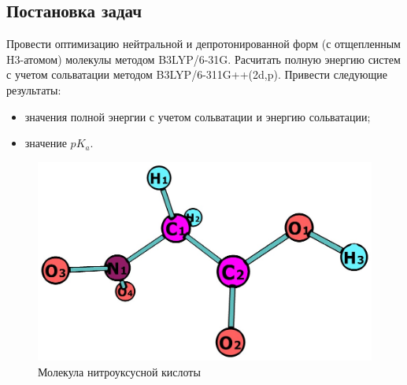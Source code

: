 \subsection{Постановка задач}
Провести оптимизацию нейтральной и депротонированной форм (с отщепленным H3-атомом) молекулы методом B3LYP/6-31G. Расчитать полную энергию систем с учетом сольватации методом B3LYP/6-311G++(2d,p). Привести следующие результаты: 
\begin{itemize}
    \item значения полной энергии с учетом сольватации и энергию сольватации;
    \item значение $pK_a$.
\end{itemize}

\begin{figure}[H]
\centering
\captionsetup{justification=centering}
\includegraphics[scale=0.4]{fig/0.jpg}
\caption{Молекула нитроуксусной кислоты}
\end{figure}